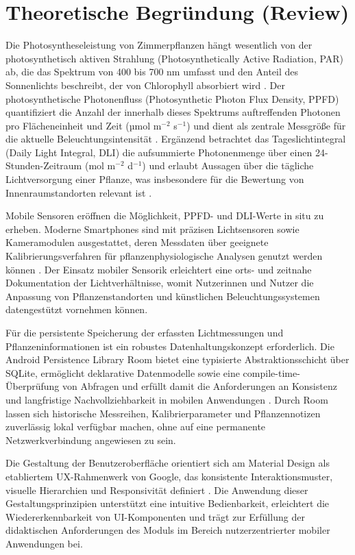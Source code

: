 \documentclass[14pt,a4paper]{report}
\begin{document}
\chapter{Theoretische Begründung (Review)}

Die Photosyntheseleistung von Zimmerpflanzen hängt wesentlich von der photosynthetisch aktiven Strahlung (Photosynthetically Active Radiation, PAR) ab, die das Spektrum von 400 bis 700 nm umfasst und den Anteil des Sonnenlichts beschreibt, der von Chlorophyll absorbiert wird \cite{McCree1972}. Der photosynthetische Photonenfluss (Photosynthetic Photon Flux Density, PPFD) quantifiziert die Anzahl der innerhalb dieses Spektrums auftreffenden Photonen pro Flächeneinheit und Zeit (µmol m$^{-2}$ s$^{-1}$) und dient als zentrale Messgröße für die aktuelle Beleuchtungsintensität \cite{NelsonBugbee2015}. Ergänzend betrachtet das Tageslichtintegral (Daily Light Integral, DLI) die aufsummierte Photonenmenge über einen 24-Stunden-Zeitraum (mol m$^{-2}$ d$^{-1}$) und erlaubt Aussagen über die tägliche Lichtversorgung einer Pflanze, was insbesondere für die Bewertung von Innenraumstandorten relevant ist \cite{FaustLogan2018}.

Mobile Sensoren eröffnen die Möglichkeit, PPFD- und DLI-Werte in situ zu erheben. Moderne Smartphones sind mit präzisen Lichtsensoren sowie Kameramodulen ausgestattet, deren Messdaten über geeignete Kalibrierungsverfahren für pflanzenphysiologische Analysen genutzt werden können \cite{Petersen2021}. Der Einsatz mobiler Sensorik erleichtert eine orts- und zeitnahe Dokumentation der Lichtverhältnisse, womit Nutzerinnen und Nutzer die Anpassung von Pflanzenstandorten und künstlichen Beleuchtungssystemen datengestützt vornehmen können.

Für die persistente Speicherung der erfassten Lichtmessungen und Pflanzeninformationen ist ein robustes Datenhaltungskonzept erforderlich. Die Android Persistence Library Room bietet eine typisierte Abstraktionsschicht über SQLite, ermöglicht deklarative Datenmodelle sowie eine compile-time-Überprüfung von Abfragen und erfüllt damit die Anforderungen an Konsistenz und langfristige Nachvollziehbarkeit in mobilen Anwendungen \cite{AndroidRoom}. Durch Room lassen sich historische Messreihen, Kalibrierparameter und Pflanzennotizen zuverlässig lokal verfügbar machen, ohne auf eine permanente Netzwerkverbindung angewiesen zu sein.

Die Gestaltung der Benutzeroberfläche orientiert sich am Material Design als etabliertem UX-Rahmenwerk von Google, das konsistente Interaktionsmuster, visuelle Hierarchien und Responsivität definiert \cite{MaterialDesign}. Die Anwendung dieser Gestaltungsprinzipien unterstützt eine intuitive Bedienbarkeit, erleichtert die Wiedererkennbarkeit von UI-Komponenten und trägt zur Erfüllung der didaktischen Anforderungen des Moduls im Bereich nutzerzentrierter mobiler Anwendungen bei.
\end{document}
